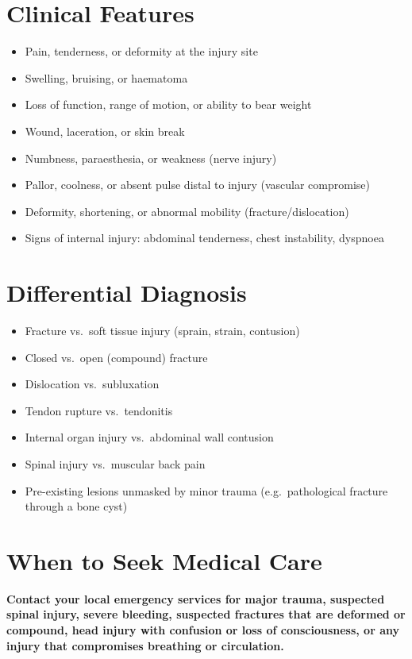 \section*{Clinical Features}
\begin{itemize}
    \item Pain, tenderness, or deformity at the injury site
    \item Swelling, bruising, or haematoma
    \item Loss of function, range of motion, or ability to bear weight
    \item Wound, laceration, or skin break
    \item Numbness, paraesthesia, or weakness (nerve injury)
    \item Pallor, coolness, or absent pulse distal to injury (vascular compromise)
    \item Deformity, shortening, or abnormal mobility (fracture/dislocation)
    \item Signs of internal injury: abdominal tenderness, chest instability, dyspnoea
\end{itemize}

\section*{Differential Diagnosis}
\begin{itemize}
    \item Fracture vs.\ soft tissue injury (sprain, strain, contusion)
    \item Closed vs.\ open (compound) fracture
    \item Dislocation vs.\ subluxation
    \item Tendon rupture vs.\ tendonitis
    \item Internal organ injury vs.\ abdominal wall contusion
    \item Spinal injury vs.\ muscular back pain
    \item Pre-existing lesions unmasked by minor trauma (e.g.\ pathological fracture through a bone cyst)
\end{itemize}

\section*{When to Seek Medical Care}
\textbf{Contact your local emergency services for major trauma, suspected spinal injury, severe bleeding, suspected fractures that are deformed or compound, head injury with confusion or loss of consciousness, or any injury that compromises breathing or circulation.}

